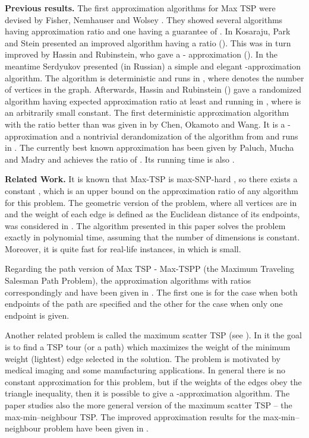 \documentclass[a4, 11pt]{article}
\newcommand{\<}{\langle}
\renewcommand{\>}{\rangle}
\begin{document}
{\bf Previous results.}  The first approximation algorithms for Max TSP were devised by Fisher, Nemhauser and Wolsey \cite{Fish}. They showed several algorithms having approximation ratio 
and  one  having a guarantee of . In \cite{Kos} Kosaraju, Park and Stein  presented an improved algorithm having a  ratio   (\cite{BH}). This was in turn improved by Hassin and Rubinstein, who gave a - approximation (\cite{HR1}).
In the meantime  Serdyukov \cite{Ser} presented (in Russian) a simple and elegant -approximation algorithm. The algorithm
is deterministic and runs in , where  denotes the number of vertices in the graph.
Afterwards, Hassin and Rubinstein (\cite{HR}) gave a randomized algorithm having  expected approximation ratio at least   and running in , where  is an arbitrarily small constant.
The first deterministic approximation algorithm with the ratio
better than  was given in \cite{Chen} by Chen, Okamoto and  Wang. It is a -approximation and a nontrivial derandomization of the algorithm from \cite{HR} and runs in . The currently best known approximation has been given by Paluch, Mucha and Madry \cite{Paluch}  and achieves the ratio of . Its running time  is also .

{\bf Related Work.} It is known that Max-TSP  is max-SNP-hard \cite{bgww}, so there exists a constant , which is an upper bound on the approximation ratio of any algorithm for this problem. The geometric version of the problem, where all vertices are in  and the  weight of each edge is defined as the Euclidean distance of its endpoints, was considered in \cite{g_maxtsp}. The algorithm presented in this paper solves the problem exactly in polynomial time, assuming that the number  of dimensions is constant. Moreover, it is quite fast for real-life instances, in which  is small. 

Regarding the path version of Max TSP - Max-TSPP (the Maximum Traveling Salesman Path Problem), the approximation algorithms with ratios correspondingly  and  have been given in \cite{Monnot}. The first one is for the case when both endpoints of the path are specified and the other for the case when only one endpoint is given.

Another related problem is called the maximum scatter TSP (see \cite{arkin}). In it the goal is to find a TSP tour (or a path) which maximizes the weight of the minimum weight (lightest) edge selected in the solution. The problem is motivated by medical imaging and some manufacturing applications.  In general there is no constant approximation for this problem, but if  the weights of the edges obey the triangle inequality, then it is possible to give a -approximation  algorithm. The paper studies also the more general version of the maximum scatter TSP -- the max-min--neighbour TSP. The improved approximation results  for the max-min--neighbour problem have been given in \cite{Chiang}.
\end{document}
